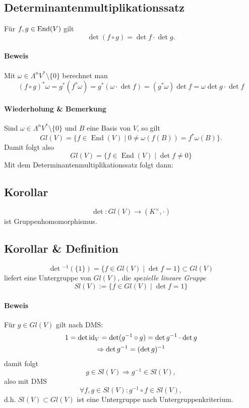 \subsection{Determinantenmultiplikationssatz}
	\begin{Satz}[Determinantenmultiplikationssatz]
		Für $ f,g\in \operatorname{End}(V) $ gilt
			\[ \det(f\circ g) = \det f \cdot \det g. \]
	\end{Satz}
\paragraph{Beweis}
	Mit $ \omega\in\Lambda^nV^*\setminus\{0\} $ berechnet man
		\[ (f\circ g)^*\omega = g^*(f^*\omega) = g^*(\omega\cdot \det f) = (g^*\omega)\det f = \omega \det g\cdot \det f \]
		
\paragraph{Wiederholung \& Bemerkung}
	Sind $ \omega\in \Lambda^nV^*\setminus \{0\} $ und $ B $ eine Basis von $ V $, so gilt
		\[ Gl(V) = \{f\in \operatorname{End}(V)\mid 0\neq \omega(f(B))=f^*\omega(B)\}. \]
	Damit folgt also
		\[ Gl(V) = \{f\in\operatorname{End}(V)\mid \det f \neq 0\} \]
	Mit dem Determinantenmultiplikationssatz folgt dann:	
\subsection{Korollar}
\begin{Korollar}
	\[ \det : Gl(V)\to (K^\times,\cdot) \]
	ist Gruppenhomomorphismus.
\end{Korollar}
\subsection{Korollar \& Definition}
\begin{Definition}
	\[ \det\text{}^{-1}(\{1\}) = \{f\in Gl(V)\mid \det f = 1\} \subset Gl(V) \]
	liefert eine Untergruppe von $ Gl(V) $, die \emph{spezielle lineare Gruppe}
	\[ Sl(V):= \{f\in Gl(V)\mid \det f = 1 \} \]
\end{Definition}
\paragraph{Beweis}
	Für $ g\in Gl(V) $ gilt nach DMS:
        \begin{gather*}
            1 = \det \operatorname{id}_V = \det(g^{-1}\circ g) = \det g^{-1}\cdot \det g \\
		\Rightarrow \det g^{-1} = (\det g)^{-1}
        \end{gather*}
	damit folgt
		\[ g\in Sl(V)\Rightarrow g^{-1} \in Sl(V), \]
	also mit DMS
		\[ \forall f,g\in Sl(V):g^{-1}\circ f\in Sl(V), \]
	d.h. $ Sl(V)\subset Gl(V) $ ist eine Untergruppe nach Untergruppenkriterium.
